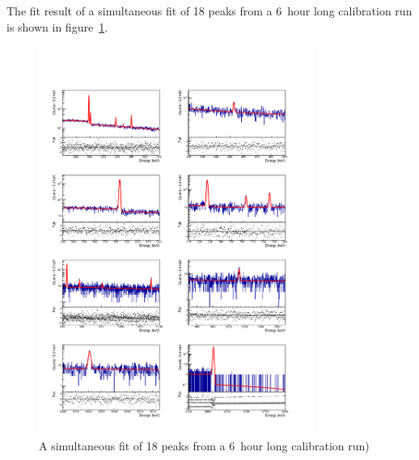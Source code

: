 \documentclass[/main.tex]{subfiles}
\begin{document}
The fit result of a simultaneous fit of 18 peaks from a 6~hour long  calibration run is shown in figure~\ref{fig:simultaneousfit}.
\begin{figure}[p]
  \centering
  \includegraphics[width=0.8\textwidth]{fitResults}
  \caption[Simultaneous peak fit of  calibration]{\label{fig:simultaneousfit}
    A simultaneous fit of 18 peaks from a 6~hour long  calibration run)
  }
\end{figure}
\end{document}
